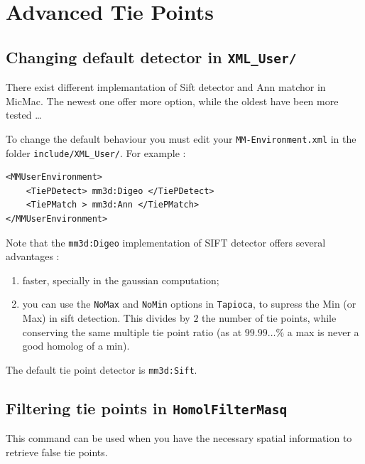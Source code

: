 \chapter{Advanced Tie Points}

\section{Changing default detector in {\tt  XML\_User/}}


There exist different implemantation of Sift detector and Ann matchor in MicMac. The newest one offer
more option, while the oldest have been more tested \dots 

To change the default behaviour you must edit your {\tt MM-Environment.xml} in the folder {\tt include/XML\_User/}.
For example :



\begin{verbatim}
<MMUserEnvironment>
    <TiePDetect> mm3d:Digeo </TiePDetect>
    <TiePMatch > mm3d:Ann </TiePMatch>
</MMUserEnvironment>
\end{verbatim}

Note that the {\tt mm3d:Digeo} implementation of SIFT detector offers several advantages :

\begin{enumerate}
   \item faster, specially in the gaussian computation;

   \item you can use the {\tt NoMax} and {\tt NoMin} options in {\tt Tapioca}, to supress the Min (or Max) in sift detection.
         This divides by $2$ the number of tie points, while conserving the same
         multiple tie point ratio (as at $99.99\dots \%$ a max is never a good homolog of a min).
\end{enumerate}

The default tie point detector is {\tt mm3d:Sift}.


\section{Filtering tie points in {\tt HomolFilterMasq}}


This command can be used when you have the necessary spatial information to retrieve false
tie points.

